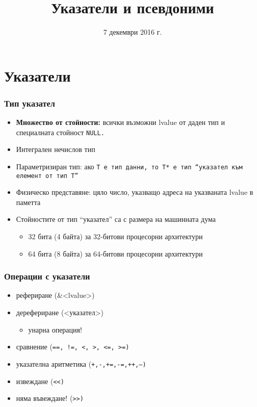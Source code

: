 \documentclass{beamer}
\title{Указатели и псевдоними}
\date{7 декември 2016 г.}
\begin{document}
\begin{frame}
  \titlepage
\end{frame}

\section{Указатели}

\begin{frame}
  \frametitle{Тип указател}

  \begin{itemize}
  \item \textbf{Множество от стойности:} всички възможни lvalue от даден тип и специалната стойност \tt{NULL}.
  \item Интегрален \alert{нечислов} тип
  \item Параметризиран тип: ако \tt T е тип данни, то \tt{T*} е тип ``указател към елемент от тип \tt T''
  \item Физическо представяне: цяло число, указващо адреса на указваната lvalue в паметта
  \item Стойностите от тип ``указател'' са с размера на машинната дума
    \begin{itemize}
    \item 32 бита (4 байта) за 32-битови процесорни архитектури
    \item 64 бита (8 байта) за 64-битови процесорни архитектури
    \end{itemize}
  \end{itemize}
\end{frame}

\begin{frame}
  \frametitle{Операции с указатели}

  \begin{itemize}
  \item рефериране (\tta\&<lvalue>)
  \item дерефериране (\tta*<указател>)
    \begin{itemize}
    \item \alert{унарна операция!}
    \end{itemize}
  \item сравнение (\tt{==}, \tt{!=}, \tt<, \tt>, \tt{<=}, \tt{>=})
  \item указателна аритметика (\tt+,\tt-,\tt{+=},\tt{-=},\tt{++},\tt{--})
  \item извеждане (\tt{<{}<})
  \item \alert{няма въвеждане! (\tt{>{}>})}
  \end{itemize}
\end{frame}
\end{document}
